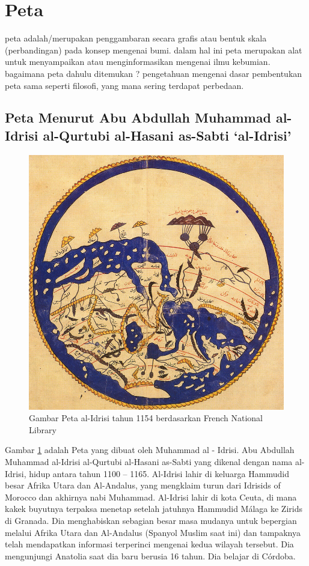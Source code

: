 
\section{Peta}
	peta adalah/merupakan penggambaran secara grafis atau bentuk skala (perbandingan) pada konsep mengenai bumi. dalam hal ini peta merupakan alat untuk menyampaikan atau menginformasikan mengenai ilmu kebumian. bagaimana peta dahulu ditemukan ? pengetahuan mengenai dasar pembentukan peta sama seperti filosofi, yang mana sering terdapat perbedaan.

\subsection{Peta Menurut Abu Abdullah Muhammad al-Idrisi al-Qurtubi al-Hasani as-Sabti `al-Idrisi'}
	\begin{figure} [ht]
	\centerline{\includegraphics[width=.5\textwidth]{figures/1.jpg}}
	\caption{Gambar Peta al-Idrisi tahun 1154 berdasarkan French National Library}
	\label{Petaal-Idrisi}
	\end{figure}
	Gambar \ref{Petaal-Idrisi} adalah Peta yang dibuat oleh Muhammad al - Idrisi. Abu Abdullah Muhammad al-Idrisi al-Qurtubi al-Hasani as-Sabti yang dikenal dengan nama al-Idrisi, hidup antara tahun 1100 – 1165. Al-Idrisi lahir di keluarga Hammudid besar Afrika Utara dan Al-Andalus, yang mengklaim turun dari Idrisids of Morocco dan akhirnya nabi Muhammad. Al-Idrisi lahir di kota Ceuta, di mana kakek buyutnya terpaksa menetap setelah jatuhnya Hammudid Málaga ke Zirids di Granada. Dia menghabiskan sebagian besar masa mudanya untuk bepergian melalui Afrika Utara dan Al-Andalus (Spanyol Muslim saat ini) dan tampaknya telah mendapatkan informasi terperinci mengenai kedua wilayah tersebut. Dia mengunjungi Anatolia saat dia baru berusia 16 tahun. Dia belajar di Córdoba.
